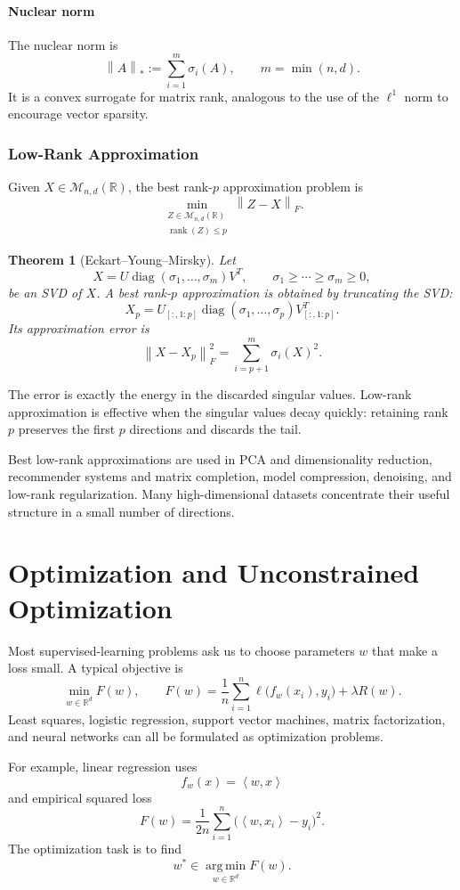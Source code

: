 \documentclass[12pt,oneside]{book}
\numberwithin{equation}{section}
\theoremstyle{definition}
\theoremstyle{plain}
\newtheorem{theorem}{Theorem}[section]
\theoremstyle{remark}
\newcommand{\R}{\mathbb{R}}
\newcommand{\argmin}{\operatorname*{arg\,min}}
\newcommand{\norm}[1]{\left\lVert #1 \right\rVert}
\newcommand{\inner}[2]{\left\langle #1, #2 \right\rangle}
\newcommand{\rank}{\operatorname{rank}}
\newcommand{\diag}{\operatorname{diag}}
\begin{document}
\paragraph{Nuclear norm}
The nuclear norm is
\[
\norm{A}_*
:=\sum_{i=1}^m\sigma_i(A),
\qquad m=\min(n,d).
\]
It is a convex surrogate for matrix rank, analogous to the use of the $\ell^1$ norm to encourage vector sparsity.

\subsubsection{Low-Rank Approximation}
Given $X\in\mathcal{M}_{n,d}(\R)$, the best rank-$p$ approximation problem is
\[
\min_{\substack{Z\in\mathcal{M}_{n,d}(\R)\\\rank(Z)\leq p}}
\norm{Z-X}_F.
\]

\begin{theorem}[Eckart--Young--Mirsky]
Let
\[
X=U\diag(\sigma_1,\ldots,\sigma_m)V^T,
\qquad
\sigma_1\geq\cdots\geq\sigma_m\geq0,
\]
be an SVD of $X$. A best rank-$p$ approximation is obtained by truncating the SVD:
\[
X_p
=U_{[:,1:p]}\diag(\sigma_1,\ldots,\sigma_p)V_{[:,1:p]}^T.
\]
Its approximation error is
\[
\norm{X-X_p}_F^2
=\sum_{i=p+1}^m\sigma_i(X)^2.
\]
\end{theorem}
The error is exactly the energy in the discarded singular values. Low-rank approximation is effective when the singular values decay quickly: retaining rank $p$ preserves the first $p$ directions and discards the tail.

Best low-rank approximations are used in PCA and dimensionality reduction, recommender systems and matrix completion, model compression, denoising, and low-rank regularization. Many high-dimensional datasets concentrate their useful structure in a small number of directions.

\section{Optimization and Unconstrained Optimization}
Most supervised-learning problems ask us to choose parameters $w$ that make a loss small. A typical objective is
\[
\min_{w\in\R^d}F(w),
\qquad
F(w)=\frac{1}{n}\sum_{i=1}^n
\ell\bigl(f_w(x_i),y_i\bigr)+\lambda R(w).
\]
Least squares, logistic regression, support vector machines, matrix factorization, and neural networks can all be formulated as optimization problems.

For example, linear regression uses
\[
f_w(x)=\inner{w}{x}
\]
and empirical squared loss
\[
F(w)=\frac{1}{2n}\sum_{i=1}^n
\bigl(\inner{w}{x_i}-y_i\bigr)^2.
\]
The optimization task is to find
\[
w^*\in\argmin_{w\in\R^d}F(w).
\]
\end{document}
